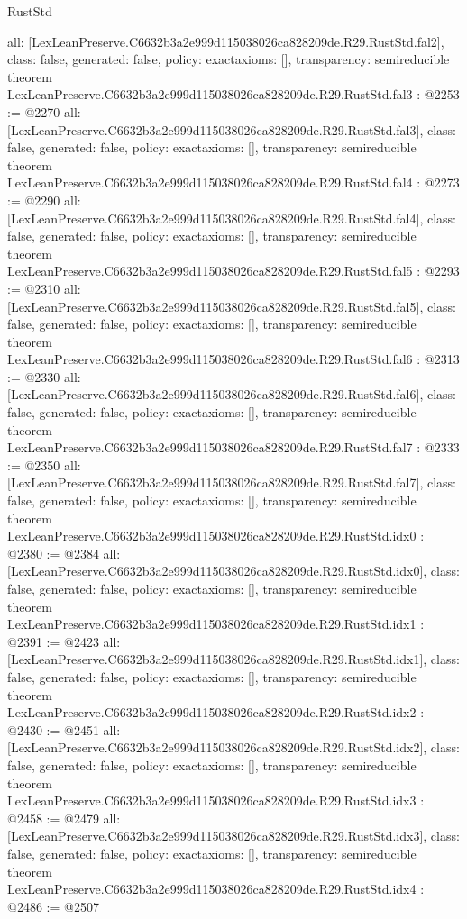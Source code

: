 \begin{lexlean}{RustStd}
\begin{coremodule}
{  all: [LexLeanPreserve.C6632b3a2e999d115038026ca828209de.R29.RustStd.fal2],
  class: false,
  generated: false,
  policy: exact{axioms: []},
  transparency: semireducible
}
theorem LexLeanPreserve.C6632b3a2e999d115038026ca828209de.R29.RustStd.fal3 : @2253 := @2270 {
  all: [LexLeanPreserve.C6632b3a2e999d115038026ca828209de.R29.RustStd.fal3],
  class: false,
  generated: false,
  policy: exact{axioms: []},
  transparency: semireducible
}
theorem LexLeanPreserve.C6632b3a2e999d115038026ca828209de.R29.RustStd.fal4 : @2273 := @2290 {
  all: [LexLeanPreserve.C6632b3a2e999d115038026ca828209de.R29.RustStd.fal4],
  class: false,
  generated: false,
  policy: exact{axioms: []},
  transparency: semireducible
}
theorem LexLeanPreserve.C6632b3a2e999d115038026ca828209de.R29.RustStd.fal5 : @2293 := @2310 {
  all: [LexLeanPreserve.C6632b3a2e999d115038026ca828209de.R29.RustStd.fal5],
  class: false,
  generated: false,
  policy: exact{axioms: []},
  transparency: semireducible
}
theorem LexLeanPreserve.C6632b3a2e999d115038026ca828209de.R29.RustStd.fal6 : @2313 := @2330 {
  all: [LexLeanPreserve.C6632b3a2e999d115038026ca828209de.R29.RustStd.fal6],
  class: false,
  generated: false,
  policy: exact{axioms: []},
  transparency: semireducible
}
theorem LexLeanPreserve.C6632b3a2e999d115038026ca828209de.R29.RustStd.fal7 : @2333 := @2350 {
  all: [LexLeanPreserve.C6632b3a2e999d115038026ca828209de.R29.RustStd.fal7],
  class: false,
  generated: false,
  policy: exact{axioms: []},
  transparency: semireducible
}
theorem LexLeanPreserve.C6632b3a2e999d115038026ca828209de.R29.RustStd.idx0 : @2380 := @2384 {
  all: [LexLeanPreserve.C6632b3a2e999d115038026ca828209de.R29.RustStd.idx0],
  class: false,
  generated: false,
  policy: exact{axioms: []},
  transparency: semireducible
}
theorem LexLeanPreserve.C6632b3a2e999d115038026ca828209de.R29.RustStd.idx1 : @2391 := @2423 {
  all: [LexLeanPreserve.C6632b3a2e999d115038026ca828209de.R29.RustStd.idx1],
  class: false,
  generated: false,
  policy: exact{axioms: []},
  transparency: semireducible
}
theorem LexLeanPreserve.C6632b3a2e999d115038026ca828209de.R29.RustStd.idx2 : @2430 := @2451 {
  all: [LexLeanPreserve.C6632b3a2e999d115038026ca828209de.R29.RustStd.idx2],
  class: false,
  generated: false,
  policy: exact{axioms: []},
  transparency: semireducible
}
theorem LexLeanPreserve.C6632b3a2e999d115038026ca828209de.R29.RustStd.idx3 : @2458 := @2479 {
  all: [LexLeanPreserve.C6632b3a2e999d115038026ca828209de.R29.RustStd.idx3],
  class: false,
  generated: false,
  policy: exact{axioms: []},
  transparency: semireducible
}
theorem LexLeanPreserve.C6632b3a2e999d115038026ca828209de.R29.RustStd.idx4 : @2486 := @2507 {
}
\end{coremodule}
\end{lexlean}
